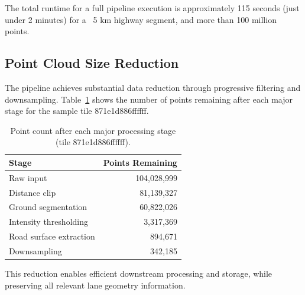 The total runtime for a full pipeline execution is approximately 115 seconds (just under 2 minutes) for a ~5 km highway segment, and more than 100 million points.

\subsection{Point Cloud Size Reduction}
The pipeline achieves substantial data reduction through progressive filtering and downsampling. Table~\ref{tab:point_reduction} shows the number of points remaining after each major stage for the sample tile 871e1d886ffffff.

\begin{table}[htbp]
  \centering
  \caption{Point count after each major processing stage (tile 871e1d886ffffff).}
  \label{tab:point_reduction}
  \small
  \begin{tabular}{@{}lr@{}}
    \hline
    \textbf{Stage} & \textbf{Points Remaining} \\
    \hline
    Raw input & 104,028,999 \\
    Distance clip & 81,139,327 \\
    Ground segmentation & 60,822,026 \\
    Intensity thresholding & 3,317,369 \\
    Road surface extraction & 894,671 \\
    Downsampling & 342,185 \\
    \hline
  \end{tabular}
\end{table}

This reduction enables efficient downstream processing and storage, while preserving all relevant lane geometry information.
